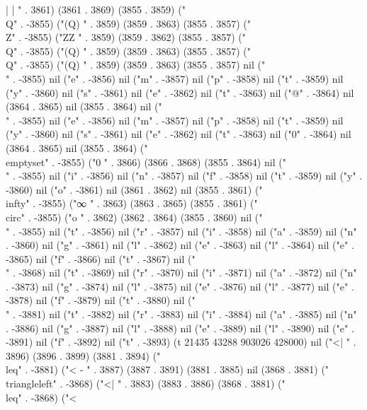 | |
" . 3861) (3861 . 3869) (3855 . 3859) ("\\Q" . -3855) ("(Q)
" . 3859) (3859 . 3863) (3855 . 3857) ("\\Z" . -3855) ("ZZ
" . 3859) (3859 . 3862) (3855 . 3857) ("\\Q" . -3855) ("(Q)
" . 3859) (3859 . 3863) (3855 . 3857) ("\\Q" . -3855) ("(Q)
" . 3859) (3859 . 3863) (3855 . 3857) nil ("\\" . -3855) nil ("e" . -3856) nil ("m" . -3857) nil ("p" . -3858) nil ("t" . -3859) nil ("y" . -3860) nil ("s" . -3861) nil ("e" . -3862) nil ("t" . -3863) nil ("@" . -3864) nil (3864 . 3865) nil (3855 . 3864) nil ("\\" . -3855) nil ("e" . -3856) nil ("m" . -3857) nil ("p" . -3858) nil ("t" . -3859) nil ("y" . -3860) nil ("s" . -3861) nil ("e" . -3862) nil ("t" . -3863) nil ("0" . -3864) nil (3864 . 3865) nil (3855 . 3864) ("\\emptyset" . -3855) ("0
" . 3866) (3866 . 3868) (3855 . 3864) nil ("\\" . -3855) nil ("i" . -3856) nil ("n" . -3857) nil ("f" . -3858) nil ("t" . -3859) nil ("y" . -3860) nil ("o" . -3861) nil (3861 . 3862) nil (3855 . 3861) ("\\infty" . -3855) ("∞
" . 3863) (3863 . 3865) (3855 . 3861) ("\\circ" . -3855) ("o
" . 3862) (3862 . 3864) (3855 . 3860) nil ("\\" . -3855) nil ("t" . -3856) nil ("r" . -3857) nil ("i" . -3858) nil ("a" . -3859) nil ("n" . -3860) nil ("g" . -3861) nil ("l" . -3862) nil ("e" . -3863) nil ("l" . -3864) nil ("e" . -3865) nil ("f" . -3866) nil ("t" . -3867) nil ("\\" . -3868) nil ("t" . -3869) nil ("r" . -3870) nil ("i" . -3871) nil ("a" . -3872) nil ("n" . -3873) nil ("g" . -3874) nil ("l" . -3875) nil ("e" . -3876) nil ("l" . -3877) nil ("e" . -3878) nil ("f" . -3879) nil ("t" . -3880) nil ("\\" . -3881) nil ("t" . -3882) nil ("r" . -3883) nil ("i" . -3884) nil ("a" . -3885) nil ("n" . -3886) nil ("g" . -3887) nil ("l" . -3888) nil ("e" . -3889) nil ("l" . -3890) nil ("e" . -3891) nil ("f" . -3892) nil ("t" . -3893) (t 21435 43288 903026 428000) nil ("<|
" . 3896) (3896 . 3899) (3881 . 3894) ("\\leq" . -3881) ("<
-
" . 3887) (3887 . 3891) (3881 . 3885) nil (3868 . 3881) ("\\triangleleft" . -3868) ("<|
" . 3883) (3883 . 3886) (3868 . 3881) ("\\leq" . -3868) ("<
